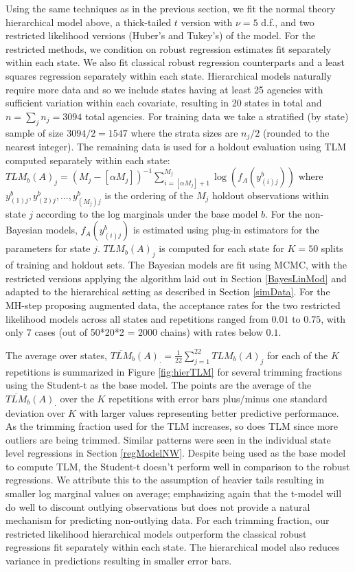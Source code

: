 \documentclass[ba]{imsart}
\newcommand{\response}[1]{{\color{blue}#1}}
\begin{document}
Using the same techniques as in the previous section, 
we fit the normal theory hierarchical model above, a thick-tailed $t$ version with $\nu = 5$ d.f., and two restricted likelihood versions (Huber's and Tukey's) of the model.  For the restricted methods, we condition on robust regression estimates fit separately within each state. We also fit classical robust regression counterparts and a least squares regression separately within each state. Hierarchical models naturally require more
data and so we include states having at least 25 agencies with sufficient variation within each covariate, resulting in 20 states in total and $n = \sum_{j} n_{j} =  3094$ total agencies. For training data we take a stratified (by state) sample of size $3094/2 = 1547$ where the strata sizes are $n_{j}/2$ (rounded to the nearest integer). The remaining data is used for a holdout evaluation using TLM computed separately within each state: $TLM_b(A)_{j} = (M_{j} - [\alpha M_{j}])^{-1} \sum_{i=[\alpha M_{j}]+1}^{M_{j}} \log(f_A(y_{(i)j}^b))$ where $y_{(1)j}^b, y_{(2)j}^b,..., y_{(M_{j})j}^b$ is the ordering of the $M_{j}$ holdout observations within state $j$ according to the log marginals under the base model $b$. For the non-Bayesian models,  $f_A(y^b_{(i)j})$ is estimated using plug-in estimators for the parameters for state $j$. $TLM_b(A)_{j}$ is computed for each state for $K=50$ splits of training and holdout sets. The Bayesian models are fit using MCMC, with the restricted versions applying the algorithm laid out in Section \ref{BayesLinMod} and adapted to the hierarchical setting as described in Section \ref{simData}. For the MH-step proposing augmented data,  \response{the acceptance rates for the two restricted likelihood models across all states and repetitions ranged from $0.01$ to  $0.75$, with only $7$ cases (out of 50*20*2 = 2000 chains) with rates below $0.1$.}


The average over states, $\overline{TLM}_b(A)_{\cdot}= \frac{1}{22} \sum_{j =1}^{22} TLM_b(A)_{j}$ for each of the $K$ repetitions is summarized in Figure
\ref{fig:hierTLM} for several trimming fractions using the Student-t as the base model. The points are the average of the $\overline{TLM}_b(A)_{\cdot}$ over the $K$ repetitions with error bars plus/minus one standard deviation over $K$ with larger values representing better predictive performance. As the trimming fraction used for the TLM increases, so does TLM since more outliers are being trimmed. Similar patterns were seen in the individual state level regressions in Section \ref{regModelNW}. Despite being used as the base model to compute TLM, the Student-t doesn't perform well in comparison to the robust regressions. We attribute this to the assumption of heavier tails resulting in smaller log marginal values on average; emphasizing again that the t-model will do well to discount outlying observations but does not provide a natural mechanism for predicting non-outlying data. For each trimming fraction, our restricted likelihood hierarchical models outperform the classical robust regressions fit separately within each state. The hierarchical model also reduces variance in predictions resulting in smaller error bars. 
\end{document}
